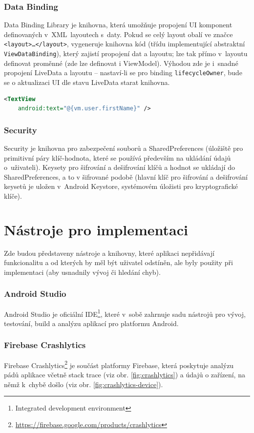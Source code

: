 \documentclass[twoside]{ctuthesis}
\begin{document}
\subsubsection{Data Binding}
Data Binding Library\cite{android2020data} je knihovna, která umožňuje propojení UI komponent definovaných v~XML~layoutech s~daty. Pokud se celý layout obalí ve značce \texttt{<layout>\ldots</layout>}, vygeneruje knihovna kód (třídu implementující ab\-strakt\-ní \texttt{ViewDataBinding}), který zajistí propojení dat a layoutu; lze tak přímo v~layoutu definovat proměnné (zde lze definovat i ViewModel). Výhodou zde je i~snadné propojení LiveData a layoutu -- nastaví-li se pro binding \texttt{lifecycleOwner}, bude se o aktualizaci UI dle stavu LiveData starat knihovna.

\begin{lstlisting}[language=XML]
<TextView
	android:text="@{vm.user.firstName}"	/>
\end{lstlisting}

\subsubsection{Security}

Security je knihovna pro zabezpečení souborů a SharedPreferences (úložiště pro primitivní páry klíč-hodnota, které se používá především na ukládání údajů o~uživateli). Keysety pro šifrování a dešifrování klíčů a hodnot se ukládají do SharedPreferences, a to v šifrované podobě (hlavní klíč pro šifrování a dešifrování keysetů je uložen v~Android Keystore, systémovém úložisti pro kryptografické klíče). \cite{android2021security}

\section{Nástroje pro implementaci}
Zde budou představeny nástroje a knihovny, které aplikaci nepřidávají funkcionalitu a od kterých by měl být uživatel odstíněn, ale byly použity při implementaci (aby usnadnily vývoj či hledání chyb).

\subsubsection{Android Studio}
Android Studio je oficiální IDE\footnote{Integrated development environment}, které v~sobě zahrnuje sadu nástrojů pro vývoj, testování, build a analýzu aplikací pro platformu Android.

\subsubsection{Firebase Crashlytics}
Firebase Crashlytics\footnote{\url{https://firebase.google.com/products/crashlytics}} je součást platformy Firebase, která poskytuje analýzu pádů aplikace včetně stack trace (viz obr. \ref{fig:crashlytics}) a údajů o zařízení, na němž k~chybě došlo (viz obr. \ref{fig:crashlytics-device}).
\end{document}
